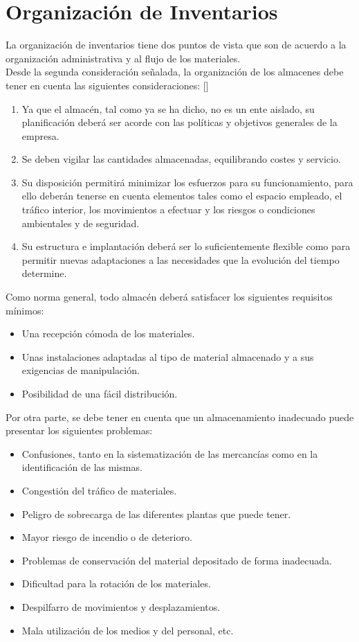 \section{Organización de Inventarios}

La organización de inventarios tiene dos puntos de vista que son de acuerdo a la organización administrativa y al flujo de los materiales.\\

Desde la segunda consideración señalada, la organización de los almacenes debe tener en cuenta las siguientes consideraciones: [\citep{UDL:2019:Online}]

\begin{enumerate}
\item Ya que el almacén, tal como ya se ha dicho, no es un ente aislado, su planificación deberá ser acorde con las políticas y objetivos generales de la empresa.
\item Se deben vigilar las cantidades almacenadas, equilibrando costes y servicio.
\item Su disposición permitirá minimizar los esfuerzos para su funcionamiento, para ello deberán tenerse en cuenta elementos tales como el espacio empleado, el tráfico interior, los movimientos a efectuar y los riesgos o condiciones ambientales y de seguridad.
\item Su estructura e implantación deberá ser lo suficientemente flexible como para permitir nuevas adaptaciones a las necesidades que la evolución del tiempo determine.
\end{enumerate}

Como norma general, todo almacén deberá satisfacer los siguientes requisitos mínimos:

\begin{itemize}
\item Una recepción cómoda de los materiales.
\item Unas instalaciones adaptadas al tipo de material almacenado y a sus exigencias de manipulación.
\item Posibilidad de una fácil distribución.
\end{itemize}

Por otra parte, se debe tener en cuenta que un almacenamiento inadecuado puede presentar los siguientes problemas:

\begin{itemize}
\item Confusiones, tanto en la sistematización de las mercancías como en la identificación de las mismas.
\item Congestión del tráfico de materiales.
\item Peligro de sobrecarga de las diferentes plantas que puede tener.
\item Mayor riesgo de incendio o de deterioro.
\item Problemas de conservación del material depositado de forma inadecuada.
\item Dificultad para la rotación de los materiales.
\item Despilfarro de movimientos y desplazamientos.
\item Mala utilización de los medios y del personal, etc.
\end{itemize}

